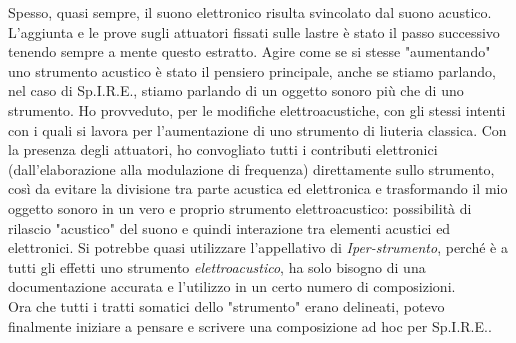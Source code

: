 Spesso, quasi sempre, il suono elettronico risulta svincolato dal suono acustico. L'aggiunta e le prove sugli attuatori fissati sulle lastre è stato il passo successivo tenendo sempre a mente questo estratto. Agire come se si stesse "aumentando" uno strumento acustico è stato il pensiero principale, anche se stiamo parlando, nel caso di Sp.I.R.E., stiamo parlando di un oggetto sonoro più che di uno strumento. Ho provveduto, per le modifiche elettroacustiche, con gli stessi intenti con i quali si lavora per l'aumentazione di uno strumento di liuteria classica. Con la presenza degli attuatori, ho convogliato tutti i contributi elettronici (dall'elaborazione alla modulazione di frequenza) direttamente sullo strumento, così da evitare la divisione tra parte acustica ed elettronica e trasformando il mio oggetto sonoro in un vero e proprio strumento elettroacustico: possibilità di rilascio "acustico" del suono e quindi interazione tra elementi acustici ed elettronici. Si potrebbe quasi utilizzare l'appellativo di \textit{Iper-strumento}, perché è a tutti gli effetti uno strumento \textit{elettroacustico}, ha solo bisogno di una documentazione accurata e l'utilizzo in un certo numero di composizioni. \\
Ora che tutti i tratti somatici dello "strumento" erano delineati, potevo finalmente iniziare a pensare e scrivere una composizione ad hoc per Sp.I.R.E.. 

